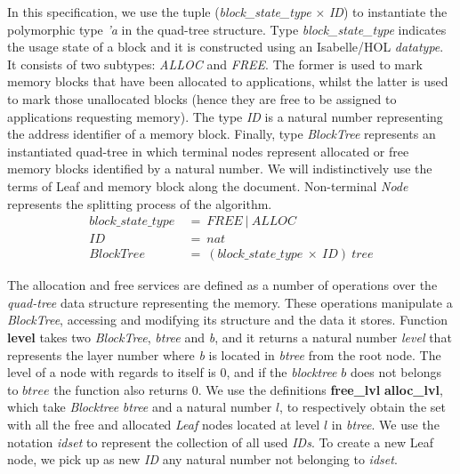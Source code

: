 In this specification, we use the tuple (\emph{block\_state\_type} $\times$ \emph{ID}) to instantiate the polymorphic type \emph{'a} in the quad-tree structure. Type \emph{block\_state\_type} indicates the usage state of a block and it is constructed using an Isabelle/HOL \emph{datatype}. It consists of two subtypes: \emph{ALLOC} and \emph{FREE}. The former is used to mark memory blocks that have been allocated to applications, whilst the latter is used to mark those unallocated blocks (hence they are free to be assigned to applications requesting memory). The type \emph{ID} is a natural number representing the address identifier of a memory block. Finally, type \emph{BlockTree} represents an instantiated quad-tree in which terminal nodes represent allocated or free memory blocks identified by a natural number. We will indistinctively use the terms of Leaf and memory block along the document. Non-terminal \emph{Node} represents the splitting process of the algorithm.
\begin{align*}
block\_state\_type\ &=\ FREE\ |\ ALLOC \\
ID\ &=\ nat \\
BlockTree\ &=\ (block\_state\_type\ \times\ ID)\ tree
\end{align*}

The allocation and free services are defined as a number of operations over the \emph{quad-tree} data structure representing the memory. These operations manipulate a \textsl{BlockTree}, accessing and modifying its structure and the data it stores. Function \textbf{level} takes two \emph{BlockTree}, \emph{btree} and \emph{b}, and it returns a natural number \emph{level} that represents the layer number where \emph{b} is located in \emph{btree} from the root node. The level of a node with regards to itself is $0$, and if the \emph{blocktree} $b$ does not belongs to $btree$ the function also returns $0$. We use the definitions \textbf{free\_lvl} \textbf{alloc\_lvl}, which take \emph{Blocktree} \emph{btree} and a natural number $l$, to respectively obtain the set with all the free and allocated \emph{Leaf} nodes located at level $l$ in \emph{btree}. We use the notation \emph{idset} to represent the collection of all used \emph{IDs}. To create a new Leaf node, we pick up as new \emph{ID} any natural number not belonging to \emph{idset}.


